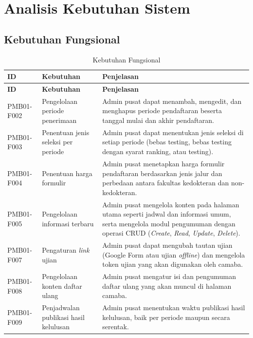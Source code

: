 \section{Analisis Kebutuhan Sistem} \label{III.AnalisisKebutuhanSistem}

\subsection{Kebutuhan Fungsional} \label{III.KebutuhanFungsional}

\begin{longtable}{|p{}|p{}|p{}|}
	\caption{Kebutuhan Fungsional}
	\label{table:3.kebutuhanfungsional}\\
	\hline
	\textbf{ID} & \textbf{Kebutuhan} & \textbf{Penjelasan} \\
	\hline
	\endfirsthead
	\hline
	\textbf{ID} & \textbf{Kebutuhan} & \textbf{Penjelasan} \\
	\hline
	\endhead
	PMB01-F002 & Pengelolaan periode penerimaan & Admin pusat dapat menambah, mengedit, dan menghapus periode pendaftaran beserta tanggal mulai dan akhir pendaftaran. \\
	\hline
	PMB01-F003 & Penentuan jenis seleksi per periode & Admin pusat dapat menentukan jenis seleksi di setiap periode (bebas testing, bebas testing dengan syarat ranking, atau testing). \\
	\hline
	PMB01-F004 & Penentuan harga formulir & Admin pusat menetapkan harga formulir pendaftaran berdasarkan jenis jalur dan perbedaan antara fakultas kedokteran dan non-kedokteran. \\
	\hline
	PMB01-F005 & Pengelolaan informasi terbaru & Admin pusat mengelola konten pada halaman utama seperti jadwal dan informasi umum, serta mengelola modul pengumuman dengan operasi CRUD (\textit{Create}, \textit{Read}, \textit{Update}, \textit{Delete}). \\
	\hline
	PMB01-F007 & Pengaturan \textit{link} ujian & Admin pusat dapat mengubah tautan ujian (Google Form atau ujian \textit{offline}) dan mengelola token ujian yang akan digunakan oleh camaba. \\
	\hline
	PMB01-F008 & Pengelolaan konten daftar ulang & Admin pusat mengatur isi dan pengumuman daftar ulang yang akan muncul di halaman camaba. \\
	\hline
	PMB01-F009 & Penjadwalan publikasi hasil kelulusan & Admin pusat menentukan waktu publikasi hasil kelulusan, baik per periode maupun secara serentak. \\

\end{longtable}

